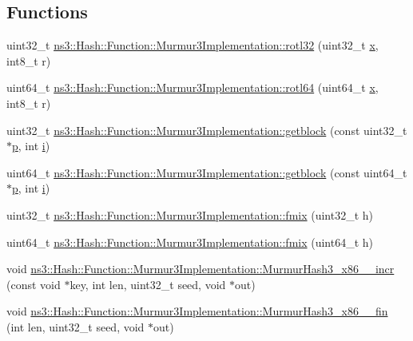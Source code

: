 \subsection*{Functions}
\begin{DoxyCompactItemize}
\item 
uint32\+\_\+t \hyperlink{group__hash__murmur3_ga5ad09e63b7268f407b727713d0f6687a}{ns3\+::\+Hash\+::\+Function\+::\+Murmur3\+Implementation\+::rotl32} (uint32\+\_\+t \hyperlink{lte__link__budget__x2__handover__measures_8m_a9336ebf25087d91c818ee6e9ec29f8c1}{x}, int8\+\_\+t r)
\item 
uint64\+\_\+t \hyperlink{group__hash__murmur3_ga5649fec849183845d5f53fd54c9bd509}{ns3\+::\+Hash\+::\+Function\+::\+Murmur3\+Implementation\+::rotl64} (uint64\+\_\+t \hyperlink{lte__link__budget__x2__handover__measures_8m_a9336ebf25087d91c818ee6e9ec29f8c1}{x}, int8\+\_\+t r)
\item 
uint32\+\_\+t \hyperlink{group__hash__murmur3_ga82df4ed13fd9546755cdf465105a524c}{ns3\+::\+Hash\+::\+Function\+::\+Murmur3\+Implementation\+::getblock} (const uint32\+\_\+t $\ast$\hyperlink{lte__link__budget__x2__handover__measures_8m_ac9de518908a968428863f829398a4e62}{p}, int \hyperlink{lte__uplink__power__control_8m_a6f6ccfcf58b31cb6412107d9d5281426}{i})
\item 
uint64\+\_\+t \hyperlink{group__hash__murmur3_ga45409abb5582f7786cd88c3c8e19744c}{ns3\+::\+Hash\+::\+Function\+::\+Murmur3\+Implementation\+::getblock} (const uint64\+\_\+t $\ast$\hyperlink{lte__link__budget__x2__handover__measures_8m_ac9de518908a968428863f829398a4e62}{p}, int \hyperlink{lte__uplink__power__control_8m_a6f6ccfcf58b31cb6412107d9d5281426}{i})
\item 
uint32\+\_\+t \hyperlink{group__hash__murmur3_ga5ace0a4c6b8f2b26528d6b939a6768ac}{ns3\+::\+Hash\+::\+Function\+::\+Murmur3\+Implementation\+::fmix} (uint32\+\_\+t h)
\item 
uint64\+\_\+t \hyperlink{group__hash__murmur3_gac511a112658af466a7fd65fcb88c35b9}{ns3\+::\+Hash\+::\+Function\+::\+Murmur3\+Implementation\+::fmix} (uint64\+\_\+t h)
\item 
void \hyperlink{group__hash__murmur3_gad303b7fe16fa5487f07a732c50128542}{ns3\+::\+Hash\+::\+Function\+::\+Murmur3\+Implementation\+::\+Murmur\+Hash3\+\_\+x86\+\_\+\_\+incr} (const void $\ast$key, int len, uint32\+\_\+t seed, void $\ast$out)
\item 
void \hyperlink{group__hash__murmur3_gaa7a43fb3327475729d3da771a405aa0c}{ns3\+::\+Hash\+::\+Function\+::\+Murmur3\+Implementation\+::\+Murmur\+Hash3\+\_\+x86\+\_\+\_\+fin} (int len, uint32\+\_\+t seed, void $\ast$out)

\end{DoxyCompactItemize}
